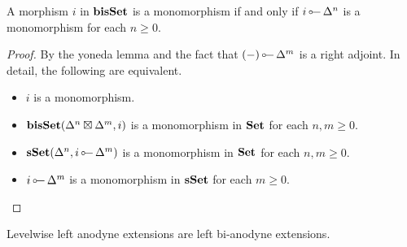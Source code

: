 \documentclass[a4paper,  dvipsnames, 11pt]{amsart}
\begin{document}
\begin{lemma}
	\label{lem:MonoLevmono}
	A morphism $i$ in $\mathbf{bisSet}$ is a monomorphism if and only if $i\lollipop \Delta^n$ is a monomorphism for each $n\geq 0$.
\end{lemma}
\begin{proof}
	By the yoneda lemma and the fact that $(-)\lollipop\Delta^m$ is a right adjoint.
	In detail, the following are equivalent.
	\begin{itemize}
		\item %
			$i$ is a monomorphism.
		\item %
			$\mathbf{bisSet}(\Delta^n\boxtimes\Delta^m,i)$ is a monomorphism in $\mathbf{Set}$ for each $n,m\geq 0$.
		\item %
			$\sSet(\Delta^n,i\lollipop\Delta^m)$ is a monomorphism in $\mathbf{Set}$ for each $n,m\geq 0$.
		\item %
			$i\lollipop\Delta^m$ is a monomorphism in $\mathbf{sSet}$ for each $m\geq 0$.
		\qedhere %
	\end{itemize}
\end{proof}
\begin{proposition}
	\label{prop:main}
	Levelwise left anodyne extensions are left bi-anodyne extensions.
\end{proposition}
\end{document}
